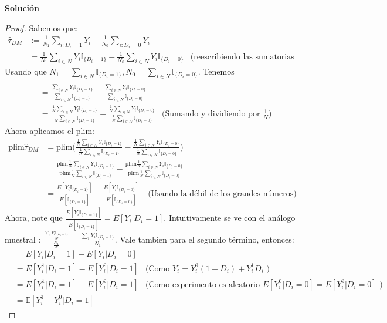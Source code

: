 \documentclass[a4paper, answers, addpoints, 11pt]{exam}
\newenvironment{solucion}{%
  \begin{mdframed}[
    backgroundcolor=blue!5,    %
    linecolor=blue!50,          %
    linewidth=2pt,              %
    leftmargin=10pt,            %
    rightmargin=10pt,           %
    topline=true,              %
    bottomline=true,            %
    roundcorner=10pt,           %
    innerleftmargin=10pt,       %
    innerrightmargin=10pt,      %
    innerbottommargin=10pt,     %
    innertopmargin=10pt         %
  ]%
  \begin{tcolorbox}[colframe=blue!50!black, colback=blue!50, coltitle=white, sharp corners=all, boxrule=1mm, width=\textwidth, halign=left, valign=center, top=0mm, bottom=0mm, left=0mm, right=0mm] \textbf{Solución} \end{tcolorbox} }{\end{mdframed}}
\begin{document}
\begin{itemize}
\begin{solucion}
        \begin{proof}
       Sabemos que:
        \begin{align*}
    \widehat{\tau}_{DM} &:= \frac{1}{N_1} \sum_{i: D_i=1} Y_i - \frac{1}{N_0} \sum_{i: D_i=0} Y_i \\&=
  \frac{1}{N_1} \sum_{i \in N} Y_i \mathbb{I}_{\{D_i=1\}} -\frac{1}{N_0} \sum_{i \in N} Y_i \mathbb{I}_{\{D_i=0\}}  &\text{(reescribiendo las sumatorias en términos de N)} 
  \end{align*}
  Usando que $N_1=\sum_{i \in N}  \mathbb{I}_{\{D_i=1\}}, N_0=\sum_{i \in N}  \mathbb{I}_{\{D_i=0\}}$. Tenemos
  \begin{align*}
  \\&=
   \frac{\sum_{i \in N} Y_i \mathbb{I}_{\{D_i=1\}}}{\sum_{i \in N}  \mathbb{I}_{\{D_i=1\}}}  -\frac{\sum_{i \in N} Y_i \mathbb{I}_{\{D_i=0\}}  }{\sum_{i \in N} \mathbb{I}_{\{D_i=0\}}} 
   \\&=
    \frac{\frac{1}{N}\sum_{i \in N} Y_i \mathbb{I}_{\{D_i=1\}}}{\frac{1}{N} \sum_{i \in N}  \mathbb{I}_{\{D_i=1\}}}  -\frac{\frac{1}{N}\sum_{i \in N} Y_i \mathbb{I}_{\{D_i=0\}}  }{\frac{1}{N}\sum_{i \in N} \mathbb{I}_{\{D_i=0\}}} &\text{(Sumando y dividiendo por $\frac{1}{N}$)} 
   \end{align*}
   Ahora aplicamos el plim:
  \begin{align*}
    \text{plim} \widehat{\tau}_{DM}&=  \text{plim} \bigg( \frac{\frac{1}{N}\sum_{i \in N} Y_i \mathbb{I}_{\{D_i=1\}}}{\frac{1}{N} \sum_{i \in N}  \mathbb{I}_{\{D_i=1\}}}  -\frac{\frac{1}{N}\sum_{i \in N} Y_i \mathbb{I}_{\{D_i=0\}}  }{\frac{1}{N}\sum_{i \in N} \mathbb{I}_{\{D_i=0\}}} \bigg) \\&=
     \frac{\text{plim}\frac{1}{N}\sum_{i \in N} Y_i \mathbb{I}_{\{D_i=1\}}}{\text{plim} \frac{1}{N} \sum_{i \in N}  \mathbb{I}_{\{D_i=1\}}}  -\frac{\text{plim}\frac{1}{N}\sum_{i \in N} Y_i \mathbb{I}_{\{D_i=0\}}  }{\text{plim}\frac{1}{N}\sum_{i \in N} \mathbb{I}_{\{D_i=0\}}}  \\&=
     \frac{E[ Y_i \mathbb{I}_{\{D_i=1\}}]}
     {E[\mathbb{I}_{\{D_i=1\}}] }  -\frac{E[ Y_i \mathbb{I}_{\{D_i=0\}}] }{E[\mathbb{I}_{\{D_i=0\}}]} \quad \text{(Usando la débil de los grandes números)} 
\end{align*}
Ahora, note que $\frac{E[ Y_i \mathbb{I}_{\{D_i=1\}}]}
     {E[\mathbb{I}_{\{D_i=1\}}] }= E[ Y_i| D_i=1]$. Intuitivamente se ve con el análogo muestral : $\frac{\frac{\sum_i Y_i \mathbb{I}_{\{D_i=1\}}}{N}}{\frac{N_1}{N}}=\frac{\sum_i Y_i \mathbb{I}_{\{D_i=1\}}}{N_1}$. Vale tambien para el segundo término, entonces:
\begin{align*}
&=E[Y_i | D_i = 1] - E[Y_i | D_i = 0]\\&=E[Y_i^{1}  | D_i = 1] - E[Y_i^{0}  | D_i = 1] &\text{(Como $Y_i=Y_i^{0} (1-D_i)+ Y_i^{1} D_i$ )}
\\&=E[Y_i^{1}  | D_i = 1] - E[Y_i^{0}  | D_i = 1] &\text{(Como experimento es aleatorio $E[Y_i^{0} | D_i = 0]=E[Y_i^{0} | D_i = 0] $ )}\\&=\mathbb{E}[Y^{1}_{i} - Y^{0}_{i} | D_i = 1]
\end{align*}


\end{proof}
\end{solucion}
\end{itemize}
\end{document}
